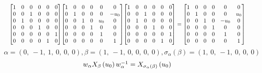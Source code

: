 \documentclass[11pt]{article}
\theoremstyle{definition}
\begin{document}
\[
\scaletoalign{\textwidth}{{\left[\begin{matrix}1 & 0 & 0 & 0 & 0 & 0\\0 & 0 & 1 & 0 & 0 & 0\\0 & 1 & 0 & 0 & 0 & 0\\0 & 0 & 0 & 1 & 0 & 0\\0 & 0 & 0 & 0 & 0 & 1\\0 & 0 & 0 & 0 & 1 & 0\end{matrix}\right]} {\left[\begin{matrix}1 & 0 & 0 & 0 & 0 & 0\\0 & 1 & 0 & 0 & 0 & - u_{0}\\0 & 0 & 1 & 0 & u_{0} & 0\\0 & 0 & 0 & 1 & 0 & 0\\0 & 0 & 0 & 0 & 1 & 0\\0 & 0 & 0 & 0 & 0 & 1\end{matrix}\right]} {\left[\begin{matrix}1 & 0 & 0 & 0 & 0 & 0\\0 & 0 & 1 & 0 & 0 & 0\\0 & 1 & 0 & 0 & 0 & 0\\0 & 0 & 0 & 1 & 0 & 0\\0 & 0 & 0 & 0 & 0 & 1\\0 & 0 & 0 & 0 & 1 & 0\end{matrix}\right]} = {\left[\begin{matrix}1 & 0 & 0 & 0 & 0 & 0\\0 & 1 & 0 & 0 & 0 & u_{0}\\0 & 0 & 1 & 0 & - u_{0} & 0\\0 & 0 & 0 & 1 & 0 & 0\\0 & 0 & 0 & 0 & 1 & 0\\0 & 0 & 0 & 0 & 0 & 1\end{matrix}\right]}}
\]
\[
\alpha = \left( 0, \  -1, \  1, \  0, \  0, \  0\right), \beta = \left( 1, \  -1, \  0, \  0, \  0, \  0\right), \sigma_{\alpha}(\beta) = \left( 1, \  0, \  -1, \  0, \  0, \  0\right)
\]
\[
\scaletoalign{\textwidth}{w_{\alpha} X_{\beta}\left(u_{0}\right) w_{\alpha}^{-1} = X_{\sigma_{\alpha}\left(\beta\right)}\left(u_{0}\right)}
\]
\end{document}
